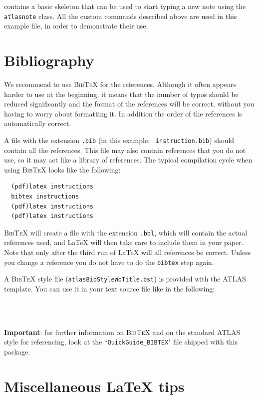 \documentclass[11pt,a4paper]{../atlasnote}
\newcommand{\BibTeX}{\textsc{Bib\TeX}}
\begin{document}
 contains a basic skeleton that can be
used to start typing a new note using the {\tt atlasnote} class. All
the custom commands described above are used in this example file, in
order to demonstrate their use.

\section{Bibliography}
\label{app:References}

We recommend to use \BibTeX{} for the references. Although it often
appears harder to use at the beginning, it means that the number of
typos should be reduced significantly and the format of the references
will be correct, without you having to worry about formatting it. In
addition the order of the references is automatically correct.

A file with the extension {\tt .bib} (in this example: {\tt
instruction.bib}) should contain all the references. This file may
also contain references that you do not use, so it may act like a
library of references. The typical compilation cycle when using
\BibTeX{} looks like the following:
%
\begin{verbatim}
  (pdf)latex instructions
  bibtex instructions
  (pdf)latex instructions
  (pdf)latex instructions
\end{verbatim}
%
\BibTeX{} will create a file with the extension {\tt .bbl}, which will
contain the actual references used, and \LaTeX{} will then take care
to include them in your paper. Note that only after the third run of
\LaTeX{} will all references be correct. Unless you change a reference
you do not have to do the {\tt bibtex} step again.

A \BibTeX{} style file ({\tt atlasBibStyleWoTitle.bst}) is provided with the
ATLAS template. You can use it in your text source file like in the
following:
%
\begin{verbatim}
  
  
\end{verbatim}
%

{\color{red} \textbf{Important}:} for further information on \BibTeX{} and on the standard ATLAS style for referencing, look at the ``{\tt QuickGuide\_BIBTEX}" file shipped with this package.


\section{Miscellaneous \LaTeX{} tips}
\label{app:LatexTips}
\end{document}
